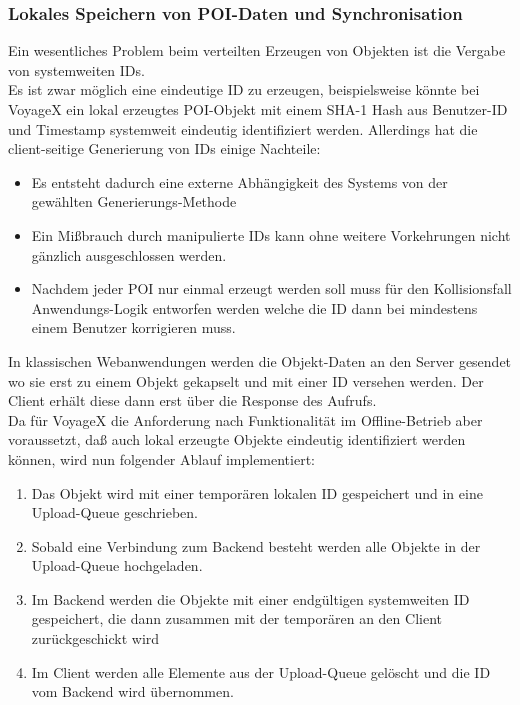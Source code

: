 \subsubsection{Lokales Speichern von POI-Daten und Synchronisation}
Ein wesentliches Problem beim verteilten Erzeugen von Objekten ist die Vergabe von systemweiten IDs.\\
Es ist zwar möglich eine eindeutige ID zu erzeugen, beispielsweise könnte bei VoyageX ein lokal
erzeugtes POI-Objekt mit einem SHA-1 Hash aus Benutzer-ID und Timestamp systemweit eindeutig identifiziert werden. Allerdings hat die client-seitige Generierung von IDs einige Nachteile:
\begin{itemize}[leftmargin=*,noitemsep,topsep=1ex,parsep=0pt,partopsep=0pt]
\item Es entsteht dadurch eine externe Abhängigkeit des Systems von der gewählten Generierungs-Methode
\item Ein Mißbrauch durch manipulierte IDs kann ohne weitere Vorkehrungen nicht gänzlich ausgeschlossen werden.
\item Nachdem jeder POI nur einmal erzeugt werden soll muss für den Kollisionsfall Anwendungs-Logik entworfen werden welche die ID dann bei mindestens einem Benutzer korrigieren muss.
\end{itemize}
In klassischen Webanwendungen werden die Objekt-Daten an den Server gesendet wo sie erst zu einem Objekt gekapselt und mit einer ID versehen werden. Der Client erhält diese dann erst über die Response des Aufrufs.\\
Da für VoyageX die Anforderung nach Funktionalität im Offline-Betrieb aber voraussetzt, daß auch lokal erzeugte Objekte eindeutig identifiziert werden können, wird nun folgender Ablauf implementiert:
\begin{enumerate}[leftmargin=*,noitemsep,topsep=1ex,parsep=0pt,partopsep=0pt]
\item Das Objekt wird mit einer temporären lokalen ID gespeichert und in eine Upload-Queue geschrieben.
\item Sobald eine Verbindung zum Backend besteht werden alle Objekte in der  Upload-Queue hochgeladen. 
\item Im Backend werden die Objekte mit einer endgültigen systemweiten ID gespeichert, die dann zusammen mit der temporären an den Client zurückgeschickt wird
\item Im Client werden alle Elemente aus der Upload-Queue gelöscht und die ID vom Backend wird übernommen.
\end{enumerate}
\enlargethispage{3\baselineskip} %


